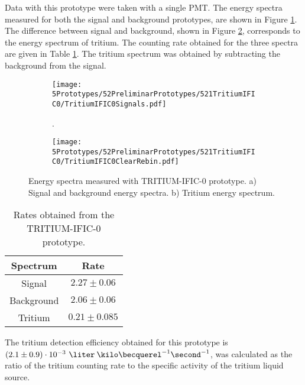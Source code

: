 Data with this prototype were taken with a single PMT. The energy spectra measured for both the signal and background prototypes, are shown in Figure \ref{subfig:SignalBackgroundEnergySpectraTritiumIFIC0}. The difference between signal and background, shown in Figure \ref{subfig:TritiumEnergySpectraTritiumIFIC0}, corresponds to the energy spectrum of tritium. The counting rate obtained for the three spectra are given in Table \ref{tab:CountsPerSecondTRITIUMIFIC0}. The tritium spectrum was obtained by subtracting the background from the signal.


\begin{figure}
\centering
    \begin{subfigure}[b]{1\textwidth}
    \centering
    \texttt{[image: 5Prototypes/52PreliminarPrototypes/521TritiumIFIC0/TritiumIFIC0Signals.pdf]}  
    \caption{.\label{subfig:SignalBackgroundEnergySpectraTritiumIFIC0}}
    \end{subfigure}
    \hfill
    \begin{subfigure}[b]{1\textwidth}
    \centering
    \texttt{[image: 5Prototypes/52PreliminarPrototypes/521TritiumIFIC0/TritiumIFIC0ClearRebin.pdf]}  
    \caption{\label{subfig:TritiumEnergySpectraTritiumIFIC0}}
    \end{subfigure}
 \caption{Energy spectra measured with TRITIUM-IFIC-0 prototype. a) Signal and background energy spectra. b) Tritium energy spectrum.}
 \label{fig:EnergySpectraTRITIUMIFIC0}
\end{figure}

\begin{table}[htbp]
\centering{}%
\begin{tabular}{cc}
\toprule 
Spectrum & Rate \tabularnewline
\midrule
\midrule 
Signal & $2.27 \pm 0.06$ \tabularnewline
Background & $2.06 \pm 0.06$ \tabularnewline  
Tritium & $0.21 \pm 0.085$ \tabularnewline
\bottomrule
\end{tabular}
\caption{Rates obtained from the TRITIUM-IFIC-0 prototype.}
\label{tab:CountsPerSecondTRITIUMIFIC0}
\end{table}

The tritium detection efficiency obtained for this prototype is $(2.1 \pm 0.9)\cdot{} 10^{-3}~\liter\:\kilo\becquerel^{-1}\second^{-1}$, was calculated as the ratio of the tritium counting rate to the specific activity of the tritium liquid source. 

